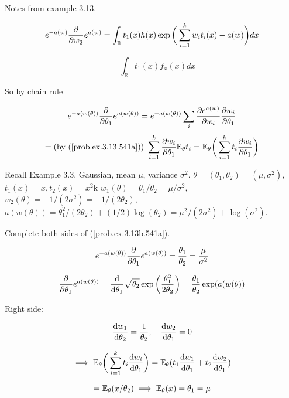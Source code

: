 \begin{remark} Notes from example 3.13.

\[
e^{-a(w)} \frac{\partial }{\partial w_2} e^{a(w)} = \int_{\mathbb{R}} t_1(x) h(x) \exp \bigg( \sum_{i=1}^k w_i t_i(x) -a(w) \bigg) dx 
\]

\begin{equation}\label{prob.ex.3.13.541a}
= \int_{\mathbb{R}} t_1(x) f_x(x) dx 
\end{equation}

So by chain rule

\begin{equation}\label{prob.ex.3.13b.541a}
e^{-a(w(\theta))} \frac{\partial }{\partial \theta_1} e^{a(w(\theta))} = e^{-a(w(\theta))} \sum_i \frac{\partial e^{a(w)}}{\partial w_i} \frac{\partial w_i}{\partial \theta_1}
\end{equation}
\[
 = \text{(by (\ref{prob.ex.3.13.541a})) } \sum_{i=1}^k \frac{\partial w_i}{\partial \theta_1} \mathbb{E}_{\theta} t_i = \mathbb{E}_{\theta} \bigg( \sum_{i=1}^k t_i \frac{\partial w_i}{\partial \theta_1} \bigg)
\]

\end{remark}

\begin{example} Recall Example 3.3. Gaussian, mean \(\mu\), variance \(\sigma^2\). \(\theta = (\theta_1, \theta_2) = (\mu, \sigma^2)\), \(t_1(x) = x, t_2(x) = x^2\)k \(w_1(\theta) = \theta_1/\theta_2 = \mu/\sigma^2\), \(w_2(\theta) = - 1/(2\sigma^2) = -1/(2\theta_2)\), \(a(w(\theta)) = \theta_1^2/(2\theta_2) + (1/2) \log(\theta_2) = \mu^2/(2 \sigma^2) + \log(\sigma^2)\).

Complete both sides of (\ref{prob.ex.3.13b.541a}).

\[
e^{-a(w(\theta))} \frac{\partial }{\partial \theta_1} e^{a(w(\theta))} = \frac{\theta_1}{\theta_2} = \frac{\mu}{\sigma^2}
\]

\[
 \frac{\partial }{\partial \theta_1}e^{a(w(\theta))} = \frac{\mathrm{d} }{\mathrm{d} \theta_1} \sqrt{\theta_2} \exp \bigg( \frac{\theta_1^2}{2 \theta_2} \bigg) = \frac{\theta_1}{\theta_2} \exp(a(w(\theta))
\]

Right side:

\[
\frac{\mathrm{d} w_1}{\mathrm{d} \theta_2} = \frac{1}{\theta_2}, \ \ \ \frac{\mathrm{d} w_2}{\mathrm{d} \theta_1} = 0
\]

\[
\implies \mathbb{E}_{\theta} \bigg( \sum_{i=1}^k t_i \frac{\mathrm{d} w_i}{\mathrm{d} \theta_1} \bigg) = \mathbb{E}_{\theta}(t_1 \frac{\mathrm{d} w_1}{\mathrm{d} \theta_1} + t_2 \frac{\mathrm{d} w_2}{\mathrm{d} \theta_1} ) 
\]

\[
= \mathbb{E}_{\theta} ( x/ \theta_2) \implies \mathbb{E}_{\theta}(x) = \theta_1 =  \mu
\]

\end{example}

